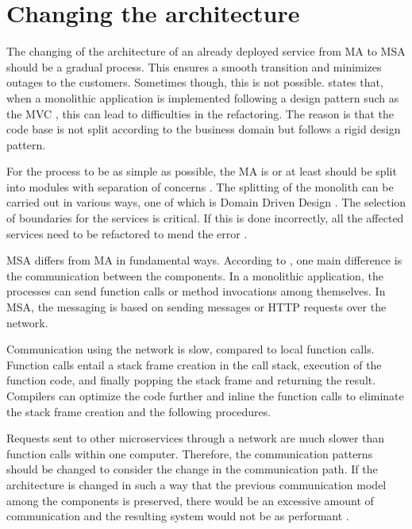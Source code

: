 \section{Changing the architecture}
\begin{sloppypar}
    The changing of the architecture of an already deployed service from MA to
    MSA should be a gradual process. This ensures a smooth transition and
    minimizes outages to the customers. Sometimes though, this is not possible.
    \citet{newman2019} states that, when a monolithic application is implemented
    following a design pattern such as the MVC \citep{trygvemvc}, this can lead
    to difficulties in the refactoring. The reason is that the code base is not
    split according to the business domain but follows a rigid design pattern.
\end{sloppypar}
\begin{sloppypar}
    For the process to be as simple as possible, the MA is or at least should be
    split into modules with separation of concerns \citep{secchalmsa}. The
    splitting of the monolith can be carried out in various ways, one of which
    is Domain Driven Design \citep{evans2003}. The selection of boundaries for
    the services is critical. If this is done incorrectly, all the affected
    services need to be refactored to mend the error \citep{newman2019}.
\end{sloppypar}
\begin{sloppypar}
    MSA differs from MA in fundamental ways. According to \citet{fowlerlewisms},
    one main difference is the communication between the components. In a
    monolithic application, the processes can send function calls or method
    invocations among themselves. In MSA, the messaging is based on sending
    messages or HTTP requests over the network. 
\end{sloppypar}
\begin{sloppypar}
    Communication using the network is slow, compared to local function calls.
    Function calls entail a stack frame creation in the call stack, execution of
    the function code, and finally popping the stack frame and returning the
    result. Compilers can optimize the code further and inline the function
    calls to eliminate the stack frame creation and the following procedures.
\end{sloppypar}
\begin{sloppypar}
    Requests sent to other microservices through a network are much slower than
    function calls within one computer. Therefore, the communication patterns
    should be changed to consider the change in the communication path. If the
    architecture is changed in such a way that the previous communication model
    among the components is preserved, there would be an excessive amount of
    communication and the resulting system would not be as performant
    \citep{fowlerlewisms}. 
\end{sloppypar}
